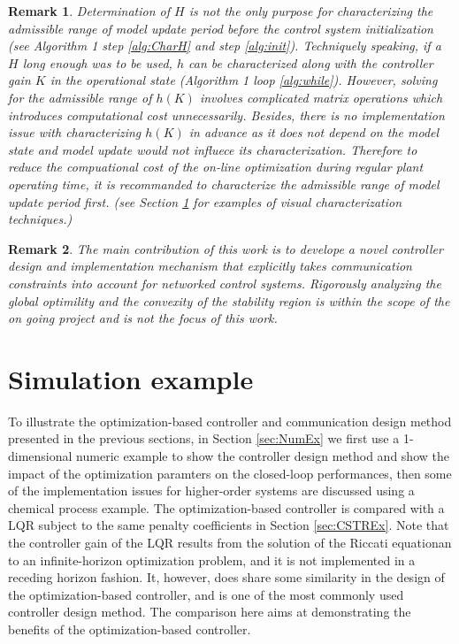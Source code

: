 \documentclass[letterpaper, 10 pt, conference]{ieeeconf}\IEEEoverridecommandlockouts%
\newtheorem{remark}{Remark}
\begin{document}
\begin{remark}
  Determination of $H$ is not the only purpose for characterizing the admissible range of model update period before the control system initialization (see Algorithm 1 step \ref{alg:CharH} and step \ref{alg:init}). Techniquely speaking, if a $H$ long enough was to be used, $h$ can be characterized along with the controller gain $K$ in the operational state (Algorithm 1 loop \ref{alg:while}). However, solving for the admissible range of $h(K)$ involves complicated matrix operations which introduces computational cost unnecessarily. Besides, there is no implementation issue with characterizing $h(K)$ in advance as it does not depend on the model state and model update would not influece its characterization. Therefore to reduce the compuational cost of the on-line optimization during regular plant operating time, it is recommanded to characterize the admissible range of model update period first. (see Section \ref{sec:simulation} for examples of visual characterization techniques.)
\end{remark}

\begin{remark}
  The main contribution of this work is to develope a novel controller design and implementation mechanism that explicitly takes communication constraints into account for networked control systems. Rigorously analyzing the global optimility and the convexity of the stability region is within the scope of the on going project and is not the focus of this work.
\end{remark}





\section{Simulation example}\label{sec:simulation}
To illustrate the optimization-based controller and communication design method presented in the previous sections, in Section \ref{sec:NumEx} we first use a 1-dimensional numeric example to show the controller design method and show the impact of the optimization paramters on the closed-loop performances, then some of the implementation issues for higher-order systems are discussed using a chemical process example. The optimization-based controller is compared with a LQR subject to the same penalty coefficients in Section \ref{sec:CSTREx}. Note that the controller gain of the LQR results from the solution of the Riccati equationan to an infinite-horizon optimization problem, and it is not implemented in a receding horizon fashion. It, however, does share some similarity in the design of the optimization-based controller, and is one of the most commonly used controller design method. The comparison here aims at demonstrating the benefits of the optimization-based controller.
\end{document}
